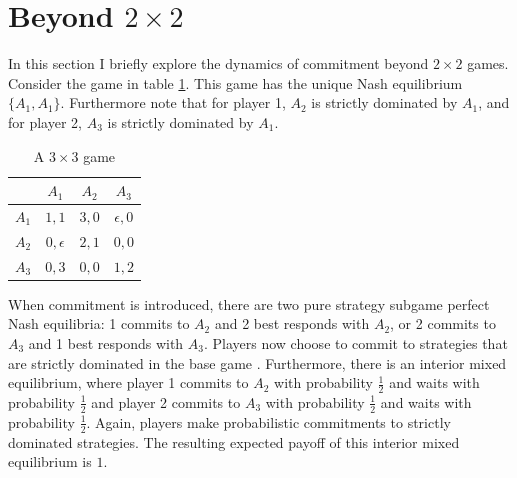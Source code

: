 \documentclass[main.tex]{subfiles}
\begin{document}
\section{Beyond $2\times2$}\label{sec:beyond2x2}
In this section I briefly explore the dynamics of commitment beyond $2\times 2$ games. Consider the game in table \ref{tab:3x3}. This game has the unique Nash equilibrium $\{A_1,A_1\}$. Furthermore note that for player 1, $A_2$ is strictly dominated by $A_1$, and for player 2, $A_3$ is strictly dominated by $A_1$.
\begin{table}[h!]
\centering
\begin{tabular}{c|ccc}
    & $A_1$ & $A_2$ & $A_3$ \\
    \hline
    $A_1$ & $1,1$ & $3,0$ & $\epsilon,0$ \\
    $A_2$ & $0,\epsilon$ & $2,1$ & $0,0$ \\
    $A_3$ & $0,3$ & $0,0$ & $1,2$ \\
\end{tabular}
\caption{A $3\times3$ game }
\label{tab:3x3}
\end{table}
When commitment is introduced, there are two pure strategy subgame perfect Nash equilibria: 1 commits to $A_2$ and 2 best responds with $A_2$, or 2 commits to $A_3$ and 1 best responds with $A_3$. Players now choose to commit to strategies that are strictly dominated in the base game \parencite[][also make the observation that commitment to dominated strategies is possible]{harrenstein_commitment_2007}. 
Furthermore, there is an interior mixed equilibrium, where player 1 commits to $A_2$ with probability $\frac{1}{2}$ and waits with probability $\frac{1}{2}$ and player 2 commits to $A_3$ with probability $\frac{1}{2}$ and waits with probability $\frac{1}{2}$. Again, players make probabilistic commitments to strictly dominated strategies. The resulting expected payoff of this interior mixed equilibrium is $1$. 
 
\end{document}
